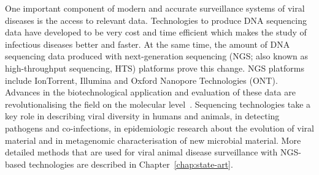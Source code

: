 One important component of modern and accurate surveillance systems of viral diseases is the access to relevant data. Technologies to produce DNA sequencing data have developed to be very cost and time efficient which makes the study of infectious diseases better and faster. At the same time, the amount of DNA sequencing data produced with next-generation sequencing (NGS; also known as high-throughput sequencing, HTS) platforms prove this change. NGS platforms include IonTorrent, Illumina and Oxford Nanopore Technologies (ONT). Advances in the biotechnological application and evaluation of these data are revolutionalising the field on the molecular level~\cite{suminda2022high}. Sequencing technologies take a key role in describing viral diversity in humans and animals, in detecting pathogens and co-infections, in epidemiologic research about the evolution of viral material and in metagenomic characterisation of new microbial material. More detailed methods that are used for viral animal disease surveillance with NGS-based technologies are described in Chapter~\ref{chap:state-art}.

